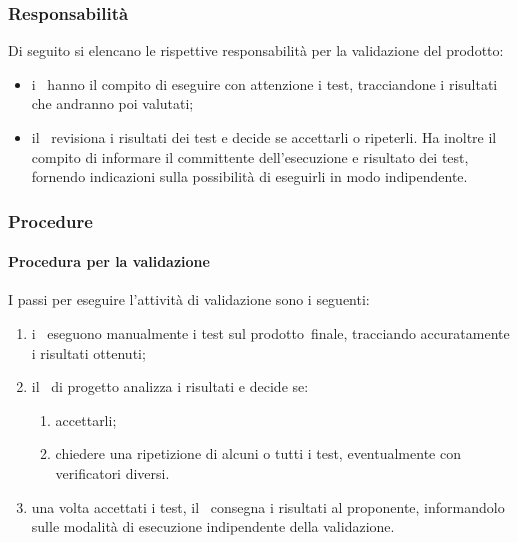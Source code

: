 \documentclass[../NormeProgetto.text]{subfiles}
\begin{document}
		\subsubsection{Responsabilità}
			Di seguito si elencano le rispettive responsabilità per la validazione del prodotto\g: 
			\begin{itemize}
				\item i \verificatori\ hanno il compito di eseguire con attenzione i test, tracciandone i risultati che andranno poi valutati;
				\item il \responsabilediprogetto\ revisiona i risultati dei test e decide se accettarli o ripeterli. Ha inoltre il compito di informare il committente dell'esecuzione e risultato dei test, fornendo indicazioni sulla possibilità di eseguirli in modo indipendente.
			\end{itemize}
			\subsubsection{Procedure}
				\paragraph{Procedura per la validazione}
					I passi per eseguire l'attività di validazione sono i seguenti:
					\begin{enumerate}
						\item i \verificatori\ eseguono manualmente i test sul prodotto\g\ finale, tracciando accuratamente i risultati ottenuti;
						\item il \responsabilediprogetto\ di progetto analizza i risultati e decide se:
							\begin{enumerate}
							 	\item accettarli;
							 	\item chiedere una ripetizione di alcuni o tutti i test, eventualmente con verificatori diversi.
							 \end{enumerate}  
						\item una volta accettati i test, il \responsabilediprogetto\ consegna i risultati al proponente, informandolo sulle modalità di esecuzione indipendente della validazione.
					\end{enumerate}
\end{document}
